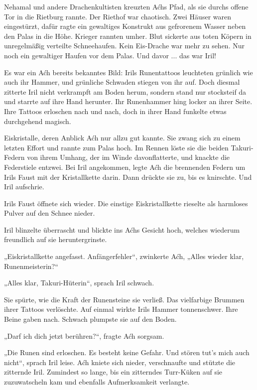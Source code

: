 \trennzeichen



Nehamal und andere Drachenkultisten kreuzten Aćhs Pfad, als sie durchs offene Tor in die Rietburg rannte. Der Riethof war chaotisch. Zwei Häuser waren eingestürzt, dafür ragte ein gewaltiges Konstrukt aus gefrorenem Wasser neben den Palas in die Höhe. Krieger rannten umher. Blut sickerte aus toten Köpern in unregelmäßig verteilte Schneehaufen. Kein Eis-Drache war mehr zu sehen. Nur noch ein gewaltiger Haufen vor dem Palas. Und davor ... das war Iril!

Es war ein Aćh bereits bekanntes Bild: Irils Runentattoos leuchteten grünlich wie auch ihr Hammer, und grünliche Schwaden stiegen von ihr auf. Doch diesmal zitterte Iril nicht verkrampft am Boden herum, sondern stand nur stocksteif da und starrte auf ihre Hand herunter. Ihr Runenhammer hing locker an ihrer Seite. Ihre Tattoos erloschen nach und nach, doch in ihrer Hand funkelte etwas durchgehend magisch.

Eiskristalle, deren Anblick Aćh nur allzu gut kannte. Sie zwang sich zu einem letzten Effort und rannte zum Palas hoch. Im Rennen löste sie die beiden Takuri-Federn von ihrem Umhang, der im Winde davonflatterte, und knackte die Federstiele entzwei. Bei Iril angekommen, legte Aćh die brennenden Federn um Irils Faust mit der Kristallkette darin. Dann drückte sie zu, bis es knirschte. Und Iril aufschrie.

Irils Faust öffnete sich wieder. Die einstige Eiskristallkette rieselte als harmloses Pulver auf den Schnee nieder.

Iril blinzelte überrascht und blickte ins Aćhs Gesicht hoch, welches wiederum freundlich auf sie heruntergrinste.

„Eiskristallkette angefasst. Anfängerfehler“, zwinkerte Aćh, „Alles wieder klar, Runenmeisterin?“

„Alles klar, Takuri-Hüterin“, sprach Iril schwach.

Sie spürte, wie die Kraft der Runensteine sie verließ. Das vielfarbige Brummen ihrer Tattoos verlöschte. Auf einmal wirkte Irils Hammer tonnenschwer. Ihre Beine gaben nach. Schwach plumpste sie auf den Boden.

„Darf ich dich jetzt berühren?“, fragte Aćh sorgsam.

„Die Runen sind erloschen. Es besteht keine Gefahr. Und stören tut’s mich auch nicht“, sprach Iril leise. Aćh kniete sich nieder, verschnaufte und stützte die zitternde Iril. Zumindest so lange, bis ein zitterndes Turr-Küken auf sie zuzuwatscheln kam und ebenfalls Aufmerksamkeit verlangte.

